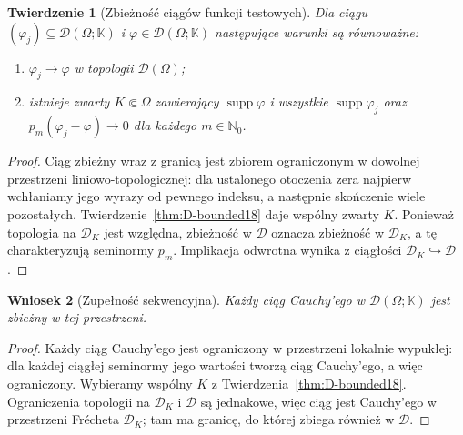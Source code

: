 \documentclass[11pt,a4paper]{article}
\numberwithin{equation}{section}
\theoremstyle{plain}
\newtheorem{twierdzenie}{Twierdzenie}[section]
\newtheorem{wniosek}[twierdzenie]{Wniosek}
\theoremstyle{definition}
\theoremstyle{remark}
\newcommand{\N}{\mathbb N}
\newcommand{\K}{\mathbb K}
\DeclareMathOperator{\supp}{supp}
\begin{document}
\begin{twierdzenie}[Zbieżność ciągów funkcji testowych]
\label{thm:D-sequences18}
Dla ciągu $(\varphi_j)\subseteq\mathcal D(\Omega;\K)$
i $\varphi\in\mathcal D(\Omega;\K)$ następujące warunki
są równoważne:
\begin{enumerate}
\item $\varphi_j\to\varphi$ w topologii $\mathcal D(\Omega)$;
\item istnieje zwarty $K\Subset\Omega$ zawierający
$\supp\varphi$ i wszystkie $\supp\varphi_j$ oraz
$p_m(\varphi_j-\varphi)\to0$ dla każdego $m\in\N_0$.
\end{enumerate}
\end{twierdzenie}
\begin{proof}
Ciąg zbieżny wraz z granicą jest zbiorem ograniczonym
w dowolnej przestrzeni liniowo-topologicznej: dla ustalonego
otoczenia zera najpierw wchłaniamy jego wyrazy od pewnego
indeksu, a następnie skończenie wiele pozostałych.
Twierdzenie~\ref{thm:D-bounded18} daje wspólny zwarty $K$.
Ponieważ topologia na $\mathcal D_K$ jest względna,
zbieżność w $\mathcal D$ oznacza zbieżność w $\mathcal D_K$,
a tę charakteryzują seminormy $p_m$.
Implikacja odwrotna wynika z ciągłości
$\mathcal D_K\hookrightarrow\mathcal D$.
\end{proof}

\begin{wniosek}[Zupełność sekwencyjna]
\label{cor:D-seqcomplete18}
Każdy ciąg Cauchy'ego w $\mathcal D(\Omega;\K)$ jest
zbieżny w tej przestrzeni.
\end{wniosek}
\begin{proof}
Każdy ciąg Cauchy'ego jest ograniczony w przestrzeni lokalnie
wypukłej: dla każdej ciągłej seminormy jego wartości tworzą
ciąg Cauchy'ego, a więc ograniczony.
Wybieramy wspólny $K$ z
Twierdzenia~\ref{thm:D-bounded18}. Ograniczenia topologii
na $\mathcal D_K$ i $\mathcal D$ są jednakowe, więc ciąg
jest Cauchy'ego w przestrzeni Fr\'echeta $\mathcal D_K$;
tam ma granicę, do której zbiega również w $\mathcal D$.
\end{proof}
\end{document}
